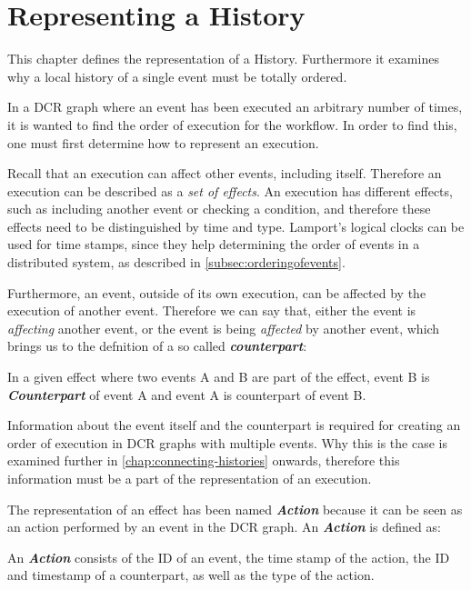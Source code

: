 \chapter{Representing a History}\label{chap:representing-a-history}
	This chapter defines the representation of a History. Furthermore it examines why a local history of a single event must be totally ordered.
	
	\newpar	In a DCR graph where an event has been executed an arbitrary number of times, it is wanted to find the order of execution for the workflow. In order to find this, one must first determine how to represent an execution.
	
	\newpar Recall that an execution can affect other events, including itself. Therefore an execution can be described as a \textit{set of effects}. An execution has different effects, such as including another event or checking a condition, and therefore these effects need to be distinguished by time and type. Lamport's logical clocks can be used for time stamps, since they help determining the order of events in a distributed system, as described in \autoref{subsec:orderingofevents}. 
	
	Furthermore, an event, outside of its own execution, can be affected by the execution of another event. Therefore we can say that, either the event is \textit{affecting} another event, or the event is being \textit{affected} by another event, which brings us to the defnition of a so called \textit{\textbf{counterpart}}:

	\begin{definition}
		In a given effect where two events A and B are part of the effect, event B is \textbf{\textit{Counterpart}} of event A and event A is counterpart of event B.
	\end{definition}
	
	\newpar Information about the event itself and the counterpart is required for creating an order of execution in DCR graphs with multiple events. Why this is the case is examined further in \autoref{chap:connecting-histories} onwards, therefore this information must be a part of the representation of an execution.
	
	\newpar The representation of an effect has been named \textit{\textbf{Action}} because it can be seen as an action performed by an event in the DCR graph. An \textit{\textbf{Action}} is defined as:
	
	\begin{definition}
		An \textit{\textbf{Action}} consists of the ID of an event, the time stamp of the action, the ID and timestamp of a counterpart, as well as  the type of the action.
	\end{definition}
	
